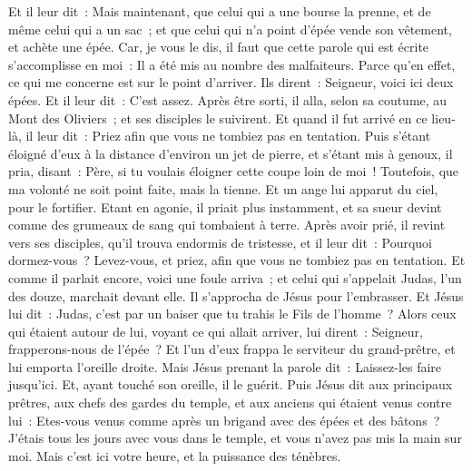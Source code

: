 \begin{multicols}{2}
Et il leur dit~: Mais maintenant, que celui qui a une bourse la prenne, et de même celui qui a un sac~; et que celui qui n'a point d'épée vende son vêtement, et achète une épée.
Car, je vous le dis, il faut que cette parole qui est écrite s'accomplisse en moi~: Il a été mis au nombre des malfaiteurs. Parce qu'en effet, ce qui me concerne est sur le point d'arriver.
Ils dirent~: Seigneur, voici ici deux épées. Et il leur dit~: C'est assez.
Après être sorti, il alla, selon sa coutume, au Mont des Oliviers~; et ses disciples le suivirent.
Et quand il fut arrivé en ce lieu-là, il leur dit~: Priez afin que vous ne tombiez pas en tentation.
Puis s'étant éloigné d'eux à la distance d'environ un jet de pierre, et s'étant mis à genoux, il pria,
disant~: Père, si tu voulais éloigner cette coupe loin de moi~! Toutefois, que ma volonté ne soit point faite, mais la tienne.
Et un ange lui apparut du ciel, pour le fortifier.
Etant en agonie, il priait plus instamment, et sa sueur devint comme des grumeaux de sang qui tombaient à terre.
Après avoir prié, il revint vers ses disciples, qu'il trouva endormis de tristesse,
et il leur dit~: Pourquoi dormez-vous~? Levez-vous, et priez, afin que vous ne tombiez pas en tentation.
Et comme il parlait encore, voici une foule arriva~; et celui qui s'appelait Judas, l'un des douze, marchait devant elle. Il s'approcha de Jésus pour l'embrasser.
Et Jésus lui dit~: Judas, c'est par un baiser que tu trahis le Fils de l'homme~?
Alors ceux qui étaient autour de lui, voyant ce qui allait arriver, lui dirent~: Seigneur, frapperons-nous de l'épée~?
Et l'un d'eux frappa le serviteur du grand-prêtre, et lui emporta l'oreille droite.
Mais Jésus prenant la parole dit~: Laissez-les faire jusqu'ici. Et, ayant touché son oreille, il le guérit.
Puis Jésus dit aux principaux prêtres, aux chefs des gardes du temple, et aux anciens qui étaient venus contre lui~: Etes-vous venus comme après un brigand avec des épées et des bâtons~?
J'étais tous les jours avec vous dans le temple, et vous n'avez pas mis la main sur moi. Mais c'est ici votre heure, et la puissance des ténèbres.

\end{multicols}
